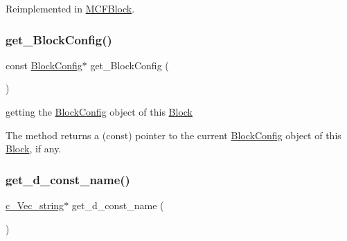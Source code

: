 Reimplemented in \mbox{\hyperlink{class_s_m_spp__di__unipi__it_1_1_m_c_f_block_a599bd50cdc6123555aa4a6c4e22c996d}{M\+C\+F\+Block}}.

\mbox{\label{class_s_m_spp__di__unipi__it_1_1_block_aff77eeb7e486daeeb142f0548478e8e3}} 
\subsubsection{\texorpdfstring{get\+\_\+\+Block\+Config()}{get\_BlockConfig()}}
{\footnotesize\ttfamily const \mbox{\hyperlink{class_s_m_spp__di__unipi__it_1_1_block_config}{Block\+Config}}$\ast$ get\+\_\+\+Block\+Config (\begin{DoxyParamCaption}\item[{void}]{ }\end{DoxyParamCaption})\hspace{0.3cm}{\ttfamily [inline]}}



getting the \mbox{\hyperlink{class_s_m_spp__di__unipi__it_1_1_block_config}{Block\+Config}} object of this \mbox{\hyperlink{class_s_m_spp__di__unipi__it_1_1_block}{Block}} 

The method returns a (const) pointer to the current \mbox{\hyperlink{class_s_m_spp__di__unipi__it_1_1_block_config}{Block\+Config}} object of this \mbox{\hyperlink{class_s_m_spp__di__unipi__it_1_1_block}{Block}}, if any. \mbox{\label{class_s_m_spp__di__unipi__it_1_1_block_a843ab91aeb7ad6839c8f3e5f131c928f}} 
\subsubsection{\texorpdfstring{get\+\_\+d\+\_\+const\+\_\+name()}{get\_d\_const\_name()}}
{\footnotesize\ttfamily \mbox{\hyperlink{group___s_m_s__types_ga4eb8b5e087882b48fc77ba2a18267301}{c\+\_\+\+Vec\+\_\+string}}$\ast$ get\+\_\+d\+\_\+const\+\_\+name (\begin{DoxyParamCaption}\item[{void}]{ }\end{DoxyParamCaption})\hspace{0.3cm}{\ttfamily [inline]}}




